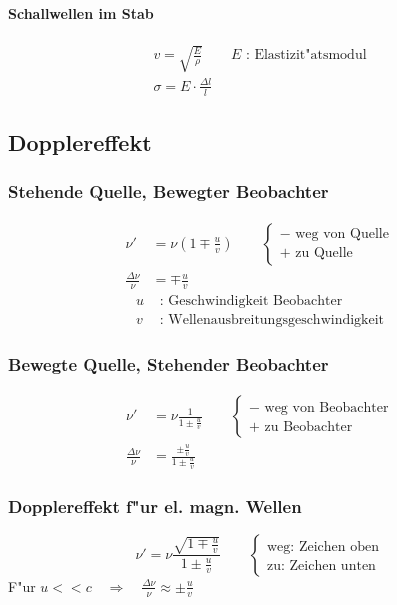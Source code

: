\paragraph{Schallwellen im Stab}
\begin{gather}
	v=\sqrt{\frac{E}{\rho}}\qquad E\text{ : Elastizit"atsmodul} \\
	\sigma=E\cdot\frac{\Delta l}{l}
\end{gather}

\subsection{Dopplereffekt}

\subsubsection{Stehende Quelle, Bewegter Beobachter}
\begin{align}
	\nu'&=\nu\left(1\mp\frac{u}{v}\right)\qquad\begin{cases}-\text{ weg von Quelle}\\+\text{ zu Quelle}\end{cases} \\
	\frac{\Delta\nu}{\nu}&=\mp\frac{u}{v}
\end{align}
\begin{align*}
	u &\text{ : Geschwindigkeit Beobachter} \\
	v &\text{ : Wellenausbreitungsgeschwindigkeit}
\end{align*}

\subsubsection{Bewegte Quelle, Stehender Beobachter}

\begin{align}
	\nu'&=\nu\frac{1}{1\pm\frac{u}{v}}\qquad\begin{cases}-\text{ weg von Beobachter}\\+\text{ zu Beobachter}\end{cases} \\
	\frac{\Delta\nu}{\nu}&=\frac{\pm\frac{u}{v}}{1\pm\frac{u}{v}}
\end{align}

\subsubsection{Dopplereffekt f"ur el. magn. Wellen}
\begin{equation}
	\nu'=\nu\frac{\sqrt{1\mp\frac{u}{v}}}{1\pm\frac{u}{v}}\qquad\begin{cases}\text{weg: Zeichen oben}\\\text{zu: Zeichen unten}\end{cases}
\end{equation}
\noindent F"ur $u<<c \quad\Longrightarrow\quad\frac{\Delta\nu}{\nu}\approx\pm\frac{u}{v}$

